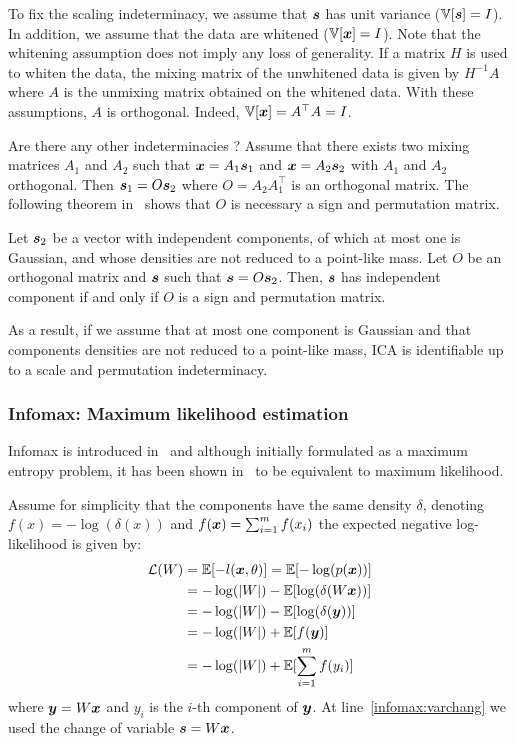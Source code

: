 To fix the scaling indeterminacy, we assume that $\boldsymbol{s}$ has unit variance ($\mathbb{V}[\boldsymbol{s}] = I$).
In addition, we assume that the data are whitened ($\mathbb{V}[\boldsymbol{x}] =
I$). Note that the whitening assumption does not imply any loss of generality. If a matrix $H$
is used to whiten the data, the mixing matrix of the unwhitened data is given by $H^{-1} A$ where $A$ is
the unmixing matrix obtained on the whitened data.
With these assumptions, $A$ is orthogonal.
Indeed, $\mathbb{V}[\boldsymbol{x}] = A^{\top} A = I$. 

Are there any other indeterminacies ? Assume that there exists two mixing matrices $A_1$ and $A_2$ such that
$\boldsymbol{x} = A_1 \boldsymbol{s}_1$ and $\boldsymbol{x} = A_2 \boldsymbol{s}_2$ with $A_1$ and $A_2$ orthogonal. Then
$\boldsymbol{s}_1 = O \boldsymbol{s}_2$ where $O=A_2 A_1^{\top}$ is an orthogonal matrix. 
The following theorem in~\cite{comon1994independent}
shows that $O$ is necessary a sign and permutation matrix.
\begin{theorem}
  Let $\boldsymbol{s}_2$  be a  vector  with  independent 
  components, of   which  at  most  one  is  Gaussian,  and whose  densities
  are  not  reduced  to  a  point-like  mass. Let $O$ be an orthogonal matrix
  and $\boldsymbol{s}$ such that $\boldsymbol{s} = O \boldsymbol{s}_2$.
  Then, $\boldsymbol{s}$ has independent component if and only if $O$ is a sign and
  permutation matrix.
\end{theorem}

As a result, if we assume that at most one component is Gaussian and that
components densities are not reduced to a point-like mass, ICA is identifiable up to a scale and permutation indeterminacy.

\subsubsection{Infomax: Maximum likelihood estimation}
Infomax is introduced in~\cite{bell1995information} and although initially formulated as a maximum entropy problem, it has been shown in~\cite{cois1997infomax} to be equivalent to maximum likelihood.

Assume for simplicity that the components have the same density $\delta$, denoting $f(x) =
-\log(\delta(x))$ and $f(\boldsymbol{x}) = \sum_{i=1}^m f(x_i)$ the expected negative log-likelihood is given by:
\begin{align}
  \mathcal{L}(W) &= \mathbb{E}[-l(\boldsymbol{x}, \theta)] = \mathbb{E}[- \log(p(\boldsymbol{x}))] \\
        &= -\log(|W|) - \mathbb{E}[\log(\delta(W \boldsymbol{x}))] \label{infomax:varchang} \\ 
        &= -\log(|W|) - \mathbb{E}[\log(\delta(\boldsymbol{y}))] \\
        &= -\log(|W|) + \mathbb{E}[f(\boldsymbol{y})] \\
        &= -\log(|W|) + \mathbb{E}[\sum_{i=1}^m f(y_i)]
\end{align}
where $\boldsymbol{y} = W \boldsymbol{x}$ and $y_i$ is the $i$-th component of $\boldsymbol{y}$.
At line~\eqref{infomax:varchang} we used the change of variable $\boldsymbol{s} = W \boldsymbol{x}$.

